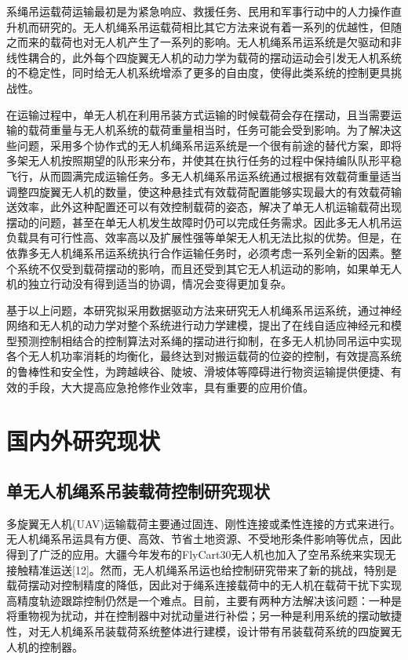\documentclass[lang=chs, degree=master, blindreview=false, winfonts=true]{yanputhesis}
\begin{document}
系绳吊运载荷运输最初是为紧急响应、救援任务、民用和军事行动中的人力操作直升机而研究的\cite{2020A}。无人机绳系吊运载荷相比其它方法来说有着一系列的优越性，但随之而来的载荷也对无人机产生了一系列的影响。无人机绳系吊运系统是欠驱动和非线性耦合的，此外每个四旋翼无人机的动力学为载荷的摆动运动会引发无人机系统的不稳定性，同时给无人机系统增添了更多的自由度，使得此类系统的控制更具挑战性。

在运输过程中，单无人机在利用吊装方式运输的时候载荷会存在摆动，且当需要运输的载荷重量与无人机系统的载荷重量相当时，任务可能会受到影响。为了解决这些问题，采用多个协作式的无人机绳系吊运系统是一个很有前途的替代方案，即将多架无人机按照期望的队形来分布，并使其在执行任务的过程中保持编队队形平稳飞行，从而圆满完成运输任务。多无人机绳系吊运系统通过根据有效载荷重量适当调整四旋翼无人机的数量，使这种悬挂式有效载荷配置能够实现最大的有效载荷输送效率，此外这种配置还可以有效控制载荷的姿态，解决了单无人机运输载荷出现摆动的问题，甚至在单无人机发生故障时仍可以完成任务需求。因此多无人机吊运负载具有可行性高、效率高以及扩展性强等单架无人机无法比拟的优势。但是，在依靠多无人机绳系吊运系统执行合作运输任务时，必须考虑一系列全新的因素。整个系统不仅受到载荷摆动的影响，而且还受到其它无人机运动的影响，如果单无人机的独立行动没有得到适当的协调，情况会变得更加复杂。

基于以上问题，本研究拟采用数据驱动方法来研究无人机绳系吊运系统，通过神经网络和无人机的动力学对整个系统进行动力学建模，提出了在线自适应神经元和模型预测控制相结合的控制算法对系绳的摆动进行抑制，在多无人机协同吊运中实现各个无人机功率消耗的均衡化，最终达到对搬运载荷的位姿的控制，有效提高系统的鲁棒性和安全性，为跨越峡谷、陡坡、滑坡体等障碍进行物资运输提供便捷、有效的手段，大大提高应急抢修作业效率，具有重要的应用价值。

\section{国内外研究现状}
\subsection{单无人机绳系吊装载荷控制研究现状}
多旋翼无人机(UAV)运输载荷主要通过固连、刚性连接或柔性连接的方式来进行。无人机绳系吊运具有方便、高效、节省土地资源、不受地形条件影响等优点，因此得到了广泛的应用。大疆今年发布的FlyCart30无人机也加入了空吊系统来实现无接触精准运送[12]。然而，无人机绳系吊运也给控制研究带来了新的挑战，特别是载荷摆动对控制精度的降低，因此对于绳系连接载荷中的无人机在载荷干扰下实现高精度轨迹跟踪控制仍然是一个难点。目前，主要有两种方法解决该问题：一种是将重物视为扰动，并在控制器中对扰动量进行补偿；另一种是利用系统的摆动敏捷性，对无人机绳系吊装载荷系统整体进行建模，设计带有吊装载荷系统的四旋翼无人机的控制器。
\end{document}
